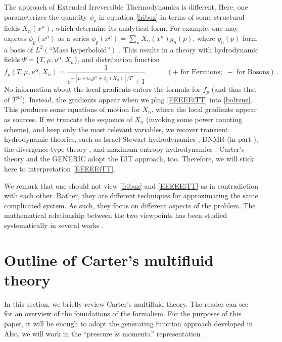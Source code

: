 \documentclass[a4paper, amsfonts, amssymb, amsmath, reprint, showkeys, nofootinbib, twoside, onecolumn, notitlepage]{revtex4-1}
\newcommand{\spc}{\quad \quad \quad}
\begin{document}
The approach of Extended Irreversible Thermodynamics is different. Here, one parameterizes the quantity $\phi_p$ in equation \eqref{fribuz} in terms of some structural fields $X_n(x^\mu)$, which determine its analytical form. For example, one may express $\phi_p(x^\mu)$ as a series $\phi_p(x^\mu)=\sum_n X_n(x^\mu)g_n(p)$, where $g_n(p)$ form a basis of $L^2(\text{``Mass hyperboloid''})$ \cite{MTW_book}. This results in a theory with hydrodynamic fields $\Psi=\{T,\mu,u^\alpha,X_n \}$, and distribution function
\begin{equation}\label{EEEEEiTT}
     f_p(T,\mu,u^\alpha,X_n)= \dfrac{1}{e^{-[\mu{+}u_\alpha p^\alpha+\phi_p(X_n)]/T}{\pm} 1} \spc (+\text{ for Fermions}; \, \,-\text{ for Bosons}) \, .   
\end{equation}
No information about the local gradients enters the formula for $f_p$ (and thus that of $T^{\mu \nu}$). Instead, the gradients appear when we plug \eqref{EEEEEiTT} into \eqref{boltzuz}. This produces some equations of motion for $X_n$, where the local gradients appear as sources. If we truncate the sequence of $X_n$ (invoking some power counting scheme), and keep only the most relevant variables, we recover transient hydrodynamic theories, such as Israel-Stewart hydrodynamics \cite{Israel_Stewart_1979}, DNMR \cite{Denicol_Relaxation_2011} (in part \cite{Denicol2012Boltzmann}), the divergence-type theory \cite{Liu1986}, and maximum entropy hydrodynamics \cite{Chattopadhyay:2023hpd}. Carter's theory and the GENERIC adopt the EIT approach, too. Therefore, we will stick here to interpretation \eqref{EEEEEiTT}. 

We remark that one should not view \eqref{fribuz} and \eqref{EEEEEiTT} as in contradiction with each other. Rather, they are different techniques for approximating the same complicated system. As such, they focus on different aspects of the problem. The mathematical relationship between the two viewpoints has been studied systematically in several works \cite{LindblomRelaxation1996,Geroch1995,HellerSingulant2022,WagnerGavassino2023}.



\section{Outline of Carter's multifluid theory}

In this section, we briefly review Carter's multifluid theory. The reader can see \cite{carter1991,carter92,Carter_starting_point,noto_rel,
andersson2007review,Termo,GavassinoRadiazione} for an overview of the foundations of the formalism. For the purposes of this paper, it will be enough to adopt the generating function approach developed in \cite{GavassinoKhalatnikov2022}. Also, we will work in the ``pressure \& momenta'' representation \cite{Prix_single_vortex,GavassinoStabilityCarter2022}.
\end{document}
